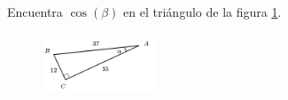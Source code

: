 Encuentra $\cos(\beta)$ en el triángulo de la figura \ref{fig:functrig12}.
\begin{figure}[H]
    \begin{center}
        \includegraphics[width=0.3\textwidth]{../images/functrig12.png}
    \end{center}
    \caption{}
    \label{fig:functrig12}
\end{figure}
